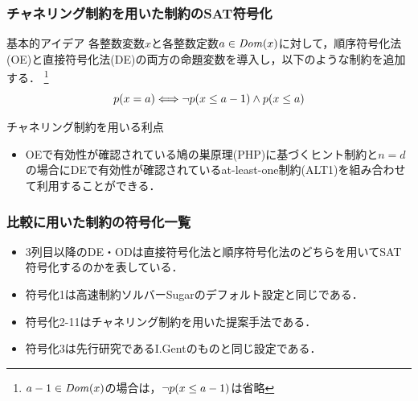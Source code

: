 \documentclass [dvipdfmx,11pt]{beamer}
\begin{document}
\begin{frame}
    \frametitle{チャネリング制約を用いた{\alldiff}制約のSAT符号化}
    \begin{block}{基本的アイデア}
        各整数変数$x$と各整数定数$a \in {\it Dom}(x)$に対して，順序符号化法(OE)と直接符号化法(DE)の両方の命題変数を導入し，以下のような制約を追加する．
        \footnote{$a-1 \in {\it Dom}(x)$の場合は，$\lnot p(x\le a-1)$は省略}
        \[
            p(x=a) \Longleftrightarrow \lnot p(x\le a-1) \land p(x\le a)
        \]
    \end{block}
    \begin{alertblock}{チャネリング制約を用いる利点}
        \begin{itemize}
            \item OEで有効性が確認されている鳩の巣原理(PHP)に基づくヒント制約と$n=d$の場合にDEで有効性が確認されているat-least-one制約(ALT1)を組み合わせて利用することができる．
        \end{itemize}
    \end{alertblock}
\end{frame}



\begin{frame}
    \frametitle{比較に用いた{\alldiff}制約の符号化一覧}
    \begin{block}{}\centering
        {\tiny }
    \end{block}
    \begin{itemize}
        \item 3列目以降のDE・ODは直接符号化法と順序符号化法のどちらを用いてSAT符号化するのかを表している．
        \item 符号化1は高速制約ソルバーSugarのデフォルト設定と同じである．
        \item 符号化2-11はチャネリング制約を用いた提案手法である．
        \item 符号化3は先行研究であるI.Gentのものと同じ設定である．
    \end{itemize}
\end{frame}
\end{document}
